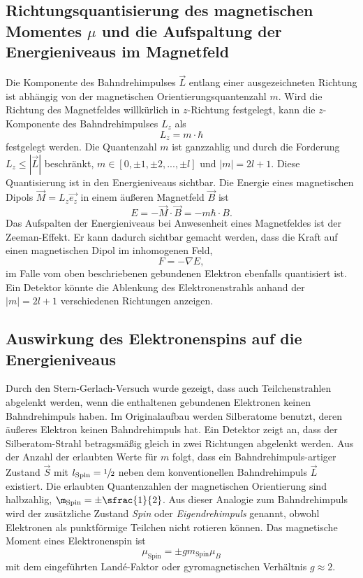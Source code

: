 \subsection{Richtungsquantisierung des \texorpdfstring{magnetischen Momentes $\mu$}{magnetischen Momentes}
und die Aufspaltung der Energieniveaus im Magnetfeld}
Die Komponente des Bahndrehimpulses $\vec{L}$ entlang einer ausgezeichneten Richtung
ist abhängig von der magnetischen Orientierungsquantenzahl $m$.
Wird die Richtung des Magnetfeldes willkürlich in $z$-Richtung festgelegt,
kann die $z$-Komponente des Bahndrehimpulses $L_z$ als
\begin{equation}
  L_z = m\cdot\hbar
\end{equation}
festgelegt werden.
Die Quantenzahl $m$ ist ganzzahlig und durch die Forderung $L_z \le |\vec{L}|$
beschränkt, $m \in [0,\pm 1,\pm 2,..., \pm l]$ und $\vert m \vert = 2l+1$.
Diese Quantisierung ist in den Energieniveaus sichtbar. Die Energie eines magnetischen
Dipols $\vec{M}=L_z\vec{e_z}$ in einem äußeren Magnetfeld $\vec{B}$ ist
\begin{equation}
  E = -\vec{M}\cdot\vec{B} = -m\hbar\cdot B.
\end{equation}
Das Aufspalten der Energieniveaus bei Anwesenheit eines Magnetfeldes ist der
Zeeman-Effekt.
Er kann dadurch sichtbar gemacht werden, dass die Kraft auf einen magnetischen
Dipol im inhomogenen Feld,
\begin{equation}
  F= -\nabla E,
\end{equation}
im Falle vom oben beschriebenen gebundenen Elektron ebenfalls quantisiert ist.
Ein Detektor könnte die Ablenkung des Elektronenstrahls anhand der $\vert m \vert = 2l+1$
verschiedenen Richtungen anzeigen.

\subsection{Auswirkung des Elektronenspins auf die Energieniveaus}
Durch den Stern-Gerlach-Versuch wurde gezeigt, dass auch Teilchenstrahlen abgelenkt
werden, wenn die enthaltenen gebundenen Elektronen keinen Bahndrehimpuls haben.
Im Originalaufbau werden Silberatome benutzt, deren äußeres Elektron keinen
Bahndrehimpuls hat.
Ein Detektor zeigt an, dass der Silberatom-Strahl betragsmäßig gleich in zwei
Richtungen abgelenkt werden.
Aus der Anzahl der erlaubten Werte für $m$ folgt, dass ein Bahndrehimpuls-artiger
Zustand $\vec{S}$ mit $l_\text{Spin} =\sfrac{1}{2}$ neben dem konventionellen
Bahndrehimpuls $\vec{L}$ existiert.
Die erlaubten Quantenzahlen der magnetischen Orientierung sind halbzahlig,
$\m_\text{Spin}=\pm\sfrac{1}{2}$.
Aus dieser Analogie zum Bahndrehimpuls wird der zusätzliche Zustand \emph{Spin}
oder \emph{Eigendrehimpuls} genannt, obwohl Elektronen als
punktförmige Teilchen nicht rotieren können.
Das magnetische Moment eines Elektronenspin ist
\begin{equation}
  \mu_\text{Spin} = \pm g m_\text{Spin} \mu_B
\end{equation}
mit dem eingeführten Landé-Faktor oder gyromagnetischen Verhältnis $g \approx 2$.
